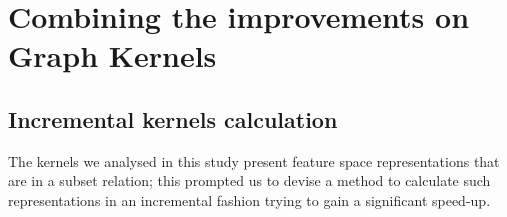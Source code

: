 
\chapter{Combining the improvements on Graph Kernels} %
\label{Chapter3} %

\section{Incremental kernels calculation}
The kernels we analysed in this study present feature space representations
that are in a subset relation; this prompted us to devise a method to calculate
such representations in an incremental fashion trying to gain a significant
speed-up.

